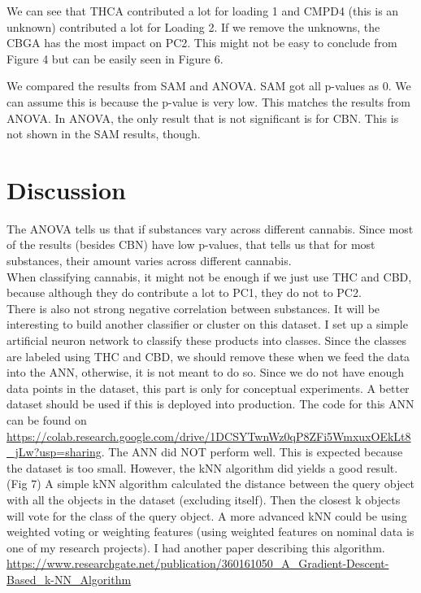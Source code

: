 \documentclass{article}
\begin{document}
\raggedright


We can see that THCA contributed a lot for loading 1 and CMPD4 (this is an unknown) contributed a lot for Loading 2. If we remove the unknowns, the CBGA has the most impact on PC2. This might not be easy to conclude from Figure 4 but can be easily seen in Figure 6.

We compared the results from SAM and ANOVA. SAM got all p-values as 0. We can assume this is because the p-value is very low. This matches the results from ANOVA. In ANOVA, the only result that is not significant is  for CBN. This is not shown in the SAM results, though. 

\section{Discussion}
The ANOVA tells us that if substances vary across different cannabis. Since most of the results (besides CBN) have low p-values, that tells us that for most substances, their amount varies across different cannabis.\\
When classifying cannabis, it might not be enough if we just use THC and CBD, because although they do contribute a lot to PC1, they do not to PC2. \\
There is also not strong negative correlation between substances.
It will be interesting to build another classifier or cluster on this dataset. I set up a simple artificial neuron network to classify these products into classes. Since the classes are labeled using THC and CBD, we should remove these when we feed the data into the ANN, otherwise, it is not meant to do so.
Since we do not have enough data points in the dataset, this part is only for conceptual experiments. A better dataset should be used if this is deployed into production. The code for this ANN can be found on \url{https://colab.research.google.com/drive/1DCSYTwnWz0qP8ZFi5WmxuxOEkLt8_jLw?usp=sharing}.
The ANN did NOT perform well. This is expected because the dataset is too small. However, the kNN algorithm did yields a good result. (Fig 7) A simple kNN algorithm calculated the distance between the query object with all the objects in the dataset (excluding itself). Then the closest k objects will vote for the class of the query object. A more advanced kNN could be using weighted voting or weighting features (using weighted features on nominal data is one of my research projects). I had another paper describing this algorithm. \url{https://www.researchgate.net/publication/360161050_A_Gradient-Descent-Based_k-NN_Algorithm} 
\end{document}
